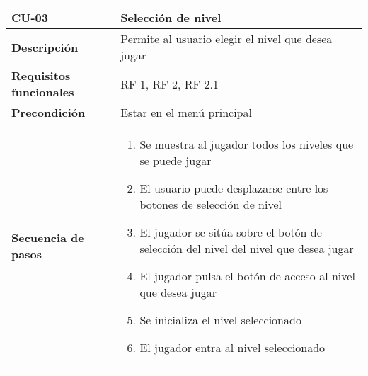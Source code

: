 \begin{longtable}{l|l}
\begin{minipage}{0.25\columnwidth}
\textbf{CU-03} 
\end{minipage}
&
\begin{minipage}{0.65\columnwidth}
Selección de nivel
\end{minipage}
\\ \hline

\begin{minipage}{0.25\columnwidth}
\textbf{Descripción} 
\end{minipage}
&
\begin{minipage}{0.65\columnwidth}
Permite al usuario elegir el nivel que desea jugar
\end{minipage}
\\ \hline

\begin{minipage}{0.25\columnwidth}
\textbf{Requisitos funcionales} 
\end{minipage}
&
\begin{minipage}{0.65\columnwidth}
RF-1, RF-2, RF-2.1
\end{minipage}
\\ \hline

\begin{minipage}{0.25\columnwidth}
\textbf{Precondición} 
\end{minipage}
&
\begin{minipage}{0.65\columnwidth}
Estar en el menú principal
\end{minipage}
\\ \hline

\begin{minipage}{0.25\columnwidth}
\textbf{Secuencia de pasos} 
\end{minipage}
&
\begin{minipage}{0.65\columnwidth}
\begin{enumerate}
\item
Se muestra al jugador todos los niveles que se puede jugar
\item
El usuario puede desplazarse entre los botones de selección de nivel
\item
El jugador se sitúa sobre el botón de selección del nivel del nivel que desea jugar
\item
El jugador pulsa el botón de acceso al nivel que desea jugar
\item
Se inicializa el nivel seleccionado
\item
El jugador entra al nivel seleccionado
\end{enumerate}
\end{minipage}
\\ \hline


\end{longtable}
